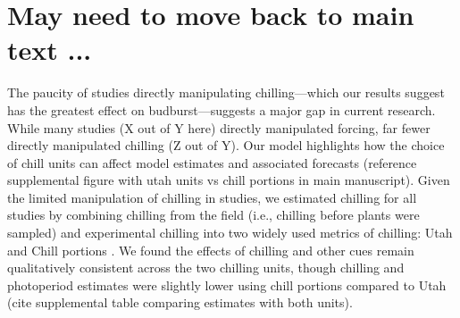 \documentclass{article}
\begin{document}
\section*{May need to move back to main text ...}

\par The paucity of studies directly manipulating chilling---which our results suggest has the greatest effect on budburst---suggests a major gap in current research. While many studies (X out of Y here) directly manipulated forcing, far fewer directly manipulated chilling (Z out of Y). 
Our model highlights how the choice of chill units can affect model estimates and associated forecasts (reference supplemental figure with utah units vs chill portions in main manuscript). 
Given the limited manipulation of chilling in studies, we estimated chilling for all studies by combining chilling from the field (i.e., chilling before plants were sampled) and experimental chilling into two widely used metrics of chilling: Utah and Chill portions \citep{dennis2003}. We found the effects of chilling and other cues remain qualitatively consistent across the two chilling units, though chilling and photoperiod estimates were slightly lower using chill portions compared to Utah (cite supplemental table comparing estimates with both units).  

\end{document}
